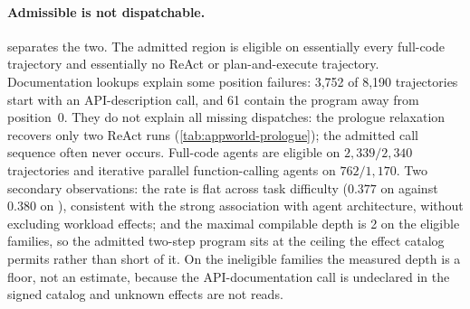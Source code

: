 \begin{table}[t]
  \centering
  \caption{Structural dispatch eligibility of the admitted AppWorld artifact on
  the 28 released official baseline runs. Eligibility is the admitted program's
  exact call sequence at normalized position~0; it is an upper bound on $\varphi$,
  because the manifest check and the calibrated gate are not evaluated and the
  released logs retain API calls rather than model boundaries. Trajectories repeat
  tasks across runs and are descriptive rather than independent samples. A miss
  abstains to the unchanged agent.}
  \label{tab:appworld-dispatch}
  \footnotesize
  \setlength{\tabcolsep}{5pt}
  
\end{table}

\paragraph{Admissible is not dispatchable.}
 separates the two. The admitted region is eligible
on essentially every full-code trajectory and essentially no ReAct or
plan-and-execute trajectory. Documentation lookups explain some position
failures: 3{,}752 of 8{,}190 trajectories start with an API-description call,
and 61 contain the program away from position~0. They do not explain all
missing dispatches: the prologue relaxation recovers only two ReAct runs
(\cref{tab:appworld-prologue}); the admitted call sequence often never occurs. Full-code
agents are eligible on $2{,}339/2{,}340$ trajectories and iterative parallel
function-calling agents on $762/1{,}170$. Two secondary observations: the rate
is flat across task difficulty ($0.377$ on  against $0.380$
on ), consistent with the strong association with agent architecture, without
excluding workload effects; and the maximal compilable depth is 2 on the eligible
families, so the admitted two-step program sits at the ceiling the effect
catalog permits rather than short of it. On the ineligible families the measured
depth is a floor, not an estimate, because the API-documentation call is
undeclared in the signed catalog and unknown effects are not reads.

\begin{table}[t]
  \centering
  \caption{Disposition of every retained external benchmark family. Only the
  four compiler-measurement rows and the BIRD live study support compiler claims; the remaining rows
  document why broader benchmark names are not silently converted into GAC
  results. BFCL appears twice because its reference plans and its executed gold
  plans are different evidence.}
  \label{tab:external-evidence-map}
  \footnotesize
  \setlength{\tabcolsep}{3pt}
  \renewcommand{\arraystretch}{1.05}
  
\end{table}

